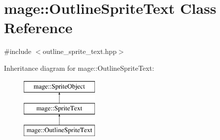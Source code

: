\hypertarget{classmage_1_1_outline_sprite_text}{}\section{mage\+:\+:Outline\+Sprite\+Text Class Reference}
\label{classmage_1_1_outline_sprite_text}


{\ttfamily \#include $<$outline\+\_\+sprite\+\_\+text.\+hpp$>$}

Inheritance diagram for mage\+:\+:Outline\+Sprite\+Text\+:\begin{figure}[H]
\begin{center}
\leavevmode
\includegraphics[height=3.000000cm]{classmage_1_1_outline_sprite_text}
\end{center}
\end{figure}
